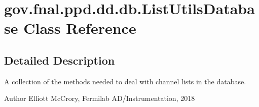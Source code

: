 \hypertarget{classgov_1_1fnal_1_1ppd_1_1dd_1_1db_1_1ListUtilsDatabase}{\section{gov.\-fnal.\-ppd.\-dd.\-db.\-List\-Utils\-Database Class Reference}
\label{classgov_1_1fnal_1_1ppd_1_1dd_1_1db_1_1ListUtilsDatabase}
}


\subsection{Detailed Description}
A collection of the methods needed to deal with channel lists in the database.

\begin{DoxyAuthor}{Author}
Elliott Mc\-Crory, Fermilab A\-D/\-Instrumentation, 2018 
\end{DoxyAuthor}
